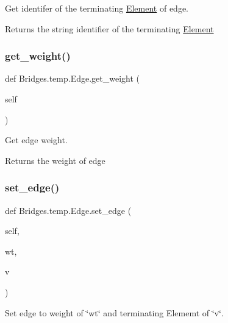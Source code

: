 Get identifer of the terminating \mbox{\hyperlink{namespace_bridges_1_1_element}{Element}} of edge. 

\begin{DoxyReturn}{Returns}
the string identifier of the terminating \mbox{\hyperlink{namespace_bridges_1_1_element}{Element}} 
\end{DoxyReturn}
\mbox{\label{class_bridges_1_1temp_1_1_edge_a53a82067c49396e22289f923c3d3b713}} 
\subsubsection{\texorpdfstring{get\+\_\+weight()}{get\_weight()}}
{\footnotesize\ttfamily def Bridges.\+temp.\+Edge.\+get\+\_\+weight (\begin{DoxyParamCaption}\item[{}]{self }\end{DoxyParamCaption})}



Get edge weight. 

\begin{DoxyReturn}{Returns}
the weight of edge 
\end{DoxyReturn}
\mbox{\label{class_bridges_1_1temp_1_1_edge_ac9eabd571940d72f50d3e253ab89bf64}} 
\subsubsection{\texorpdfstring{set\+\_\+edge()}{set\_edge()}}
{\footnotesize\ttfamily def Bridges.\+temp.\+Edge.\+set\+\_\+edge (\begin{DoxyParamCaption}\item[{}]{self,  }\item[{}]{wt,  }\item[{}]{v }\end{DoxyParamCaption})}



Set edge to weight of \char`\"{}wt\char`\"{} and terminating Elememt of \char`\"{}v\char`\"{}. 


